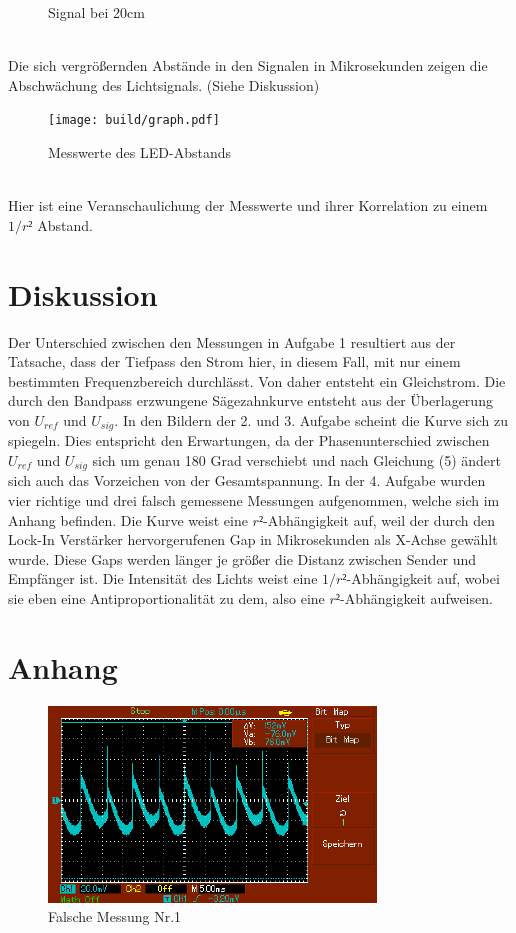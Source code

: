 \documentclass[captions=tableheading]{scrartcl}
\begin{document}
\begin{itemize}
\begin{figure}
                \caption{Signal bei 20cm}
                \label{fig:20cmled}    
            \end{figure}
            \\
        Die sich vergrößernden Abstände in den Signalen in Mikrosekunden zeigen die Abschwächung des Lichtsignals. (Siehe Diskussion)
            \begin{figure}
                \centering
                \texttt{[image: build/graph.pdf]}
                \caption{Messwerte des LED-Abstands}
                \label{fig:graph}
            \end{figure}
        \\
        Hier ist eine Veranschaulichung der Messwerte und ihrer Korrelation zu einem \(1/r²\) Abstand.
    \end{itemize}
\section{Diskussion}
Der Unterschied zwischen den Messungen in Aufgabe 1 resultiert aus der Tatsache, dass der Tiefpass den Strom hier, in diesem Fall, mit nur einem bestimmten Frequenzbereich durchlässt. Von daher entsteht ein Gleichstrom.
Die durch den Bandpass erzwungene Sägezahnkurve entsteht aus der Überlagerung von \(U_{ref}\) und \(U_{sig}\).
In den Bildern der 2. und 3. Aufgabe scheint die Kurve sich zu spiegeln. Dies entspricht den Erwartungen, da der Phasenunterschied zwischen \(U_{ref}\) und \(U_{sig}\) sich um genau 180 Grad verschiebt und nach Gleichung (5) ändert sich auch das Vorzeichen von der Gesamtspannung.
In der 4. Aufgabe wurden vier richtige und drei falsch gemessene Messungen aufgenommen, welche sich im Anhang befinden.
Die Kurve weist eine \(r²\)-Abhängigkeit auf, weil der durch den Lock-In Verstärker hervorgerufenen Gap in Mikrosekunden als X-Achse gewählt wurde. Diese Gaps werden länger je größer die Distanz zwischen Sender und Empfänger ist. Die Intensität des Lichts weist eine \(1/r²\)-Abhängigkeit auf, wobei sie eben eine Antiproportionalität zu dem, also eine \(r²\)-Abhängigkeit aufweisen.
\newpage
\section{Anhang}
    \begin{figure}
        \centering
        \includegraphics{Lock_In Bilder/Aufgabe 4/Komische Bilder/MAP001.pdf}
        \caption{Falsche Messung Nr.1}
        \label{fig:mismess1}
    \end{figure}
    
\end{document}
